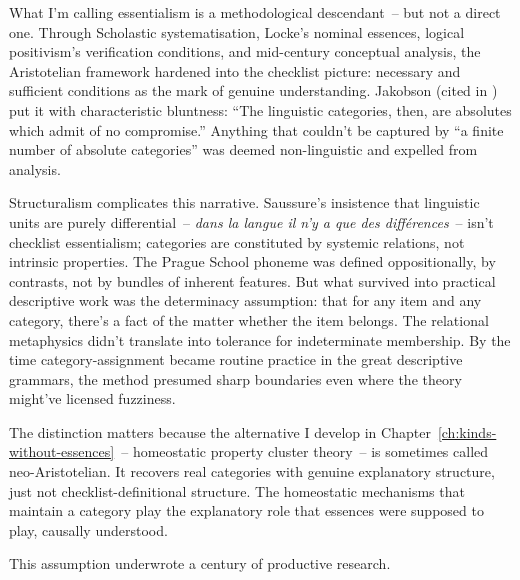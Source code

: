 What I'm calling essentialism is a methodological descendant~-- but not a direct one. Through Scholastic systematisation, Locke's nominal essences, logical positivism's verification conditions, and mid-century conceptual analysis, the Aristotelian framework hardened into the checklist picture: necessary and sufficient conditions as the mark of genuine understanding. Jakobson (cited in \cite[703]{joos1957}) put it with characteristic bluntness: \enquote{The linguistic categories, then, are absolutes which admit of no compromise.} Anything that couldn't be captured by \enquote{a finite number of absolute categories} was deemed non-linguistic and expelled from analysis.

Structuralism complicates this narrative. Saussure's insistence that linguistic units are purely differential~-- \emph{dans la langue il n'y a que des différences}~-- isn't checklist essentialism; categories are constituted by systemic relations, not intrinsic properties. The Prague School phoneme was defined oppositionally, by contrasts, not by bundles of inherent features. But what survived into practical descriptive work was the determinacy assumption: that for any item and any category, there's a fact of the matter whether the item belongs. The relational metaphysics didn't translate into tolerance for indeterminate membership. By the time category-assignment became routine practice in the great descriptive grammars, the method presumed sharp boundaries even where the theory might've licensed fuzziness.

The distinction matters because the alternative I develop in Chapter~\ref{ch:kinds-without-essences}~-- homeostatic property cluster theory~-- is sometimes called neo-Aristotelian. It recovers real categories with genuine explanatory structure, just not checklist-definitional structure. The homeostatic mechanisms that maintain a category play the explanatory role that essences were supposed to play, causally understood.

This assumption underwrote a century of productive research.

